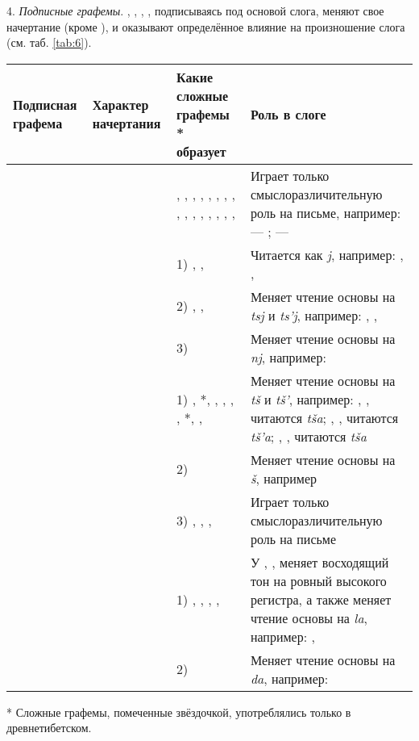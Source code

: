 4. \emph{Подписные графемы}. , , , , подписываясь под основой слога, меняют свое начертание (кроме ), и оказывают определённое влияние на произношение слога (см. таб. \ref{tab:6}).

\begin{tabularx}{\textwidth}{|L{4}|L{4}|L{10}|L{12}|}
	\caption{Подписные графемы}\label{tab:6}\\
	\hline
	Под\-пис\-ная гра\-фе\-ма & Ха\-рак\-тер на\-чер\-та\-ния & Какие сложные графемы * образует & Роль в слоге\\
	\hline
	 &  & , , , , , , , , , , , , , , , ,  & Играет только смыслоразличительную роль на письме, например:  --- ;  --- \\
	\hline
	 &  & 1) , ,  & Читается как \textit{j}, например: , , \\
	& & 2) , ,  & Меняет чтение основы на \textit{tsj} и \textit{ts'j}, например: , , \\
	& & 3)  & Меняет чтение основы на \textit{nj}, например: \\
	\hline
	 &  & 1) , *, , , , , *, ,  & Меняет чтение основы на \textit{t\v{s}} и \textit{t\v{s}'}, например: , ,  читаются \textit{t\v{s}a\toneR}; , ,  читаются \textit{t\v{s}'a\toneR}; , ,  читаются \textit{t\v{s}a\toneV}\\
	& & 2)  & Меняет чтение основы на \textit{\v{s}}, например \\
	& & 3) , , ,  & Играет только смыслоразличительную роль на письме\\
	\hline
	 &  & 1) , , , ,  & У , ,  меняет восходящий тон на ровный высокого регистра,  а также меняет чтение основы на \textit{la}, например: , \\
	& & 2)  & Меняет чтение основы на \textit{da}, например: \\
	\hline
\end{tabularx}
{\footnotesize{* Сложные графемы, помеченные звёздочкой, употреблялись только в древнетибетском.}}

